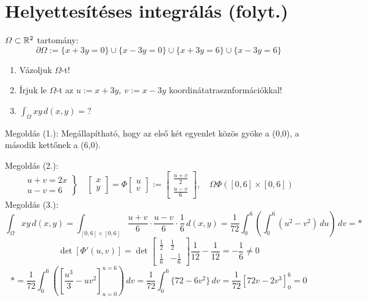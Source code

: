 \documentclass[a4paper,11.5pt]{article}
\begin{document}
	\section{Helyettesítéses integrálás (folyt.)}
	\begin{task}
		$ \varOmega\subset\mathbb{R}^2$ tartomány: $$\partial \varOmega:=\{x+3y=0\}\cup\{x-3y=0\}\cup\{x+3y=6\}\cup\{x-3y=6\}$$
		\begin{enumerate}
			\item Vázoljuk $ \varOmega$-t!
			\item Írjuk le $ \varOmega$-t az $u:=x+3y,\ v:=x-3y$ koordinátatrasznformációkkal!
			\item $\int_ \varOmega xy\,d(x,y)=?$
		\end{enumerate}
		
		Megoldás (1.): Megállapítható, hogy az első két egyenlet közös gyöke a (0,0), a második kettőnek a (6,0).
		
		Megoldás (2.): 
		\[ \left.\begin{gathered}
		u+v=2x\\
		u-v=6
		\end{gathered}\right\}\quad \begin{bmatrix}
		x\\y
		\end{bmatrix}=\varPhi \begin{bmatrix}
		u\\v
		\end{bmatrix}:=\begin{bmatrix}
		\frac{u+v}{2}\\\frac{u-v}{6}
		\end{bmatrix},\quad \varOmega\varPhi\left([0,6]\times[0,6]\right) \]
		Megoldás (3.):
		\[ \int_{\varOmega}^{}xy\,d(x,y)=\int_{[0,6]\times[0,6]}^{}\frac{u+v}{6}\cdot\frac{u-v}{6}\cdot\frac{1}{6}\,d(x,y)=\frac{1}{72}\int_{0}^{6}\left(\int_0^6(u^2-v^2)\,du\right)\,dv=* \]
		\[ \det[\varPhi'(u,v)]=\det \begin{bmatrix}
			\frac{1}{2}&\frac{1}{2}\\
			\frac{1}{6}&-\frac{1}{6}
		\end{bmatrix} \frac{1}{12}-\frac{1}{12}=-\frac{1}{6}\not=0\]
		\[ *=\frac{1}{72}\int_{0}^{6}\left( \left[\frac{u^3}{3}-uv^2\right]_{u=0}^{u=6} \right)\,dv=\frac{1}{72}\int_0^6\{72-6v^2 \}\,dv=\frac{1}{72}[72v-2v^3]_0^6=0  \]  
	\end{task}
\end{document}
